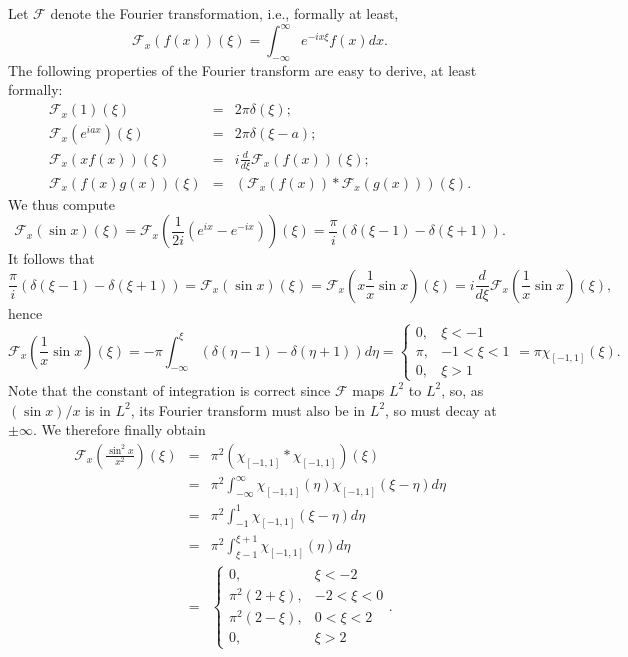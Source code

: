 \documentclass{article}
\begin{document}
\begin{enumerate}
Let \(\mathcal{F}\) denote the Fourier transformation, i.e., formally at least,
\[\mathcal{F}_x(f(x))(\xi) = \int_{-\infty}^{\infty} e^{-i x \xi} f(x) dx.\]
The following properties of the Fourier transform are easy to derive, at least formally:
\begin{eqnarray*}
\mathcal{F}_x(1)(\xi) & = & 2 \pi \delta(\xi); \\
\mathcal{F}_x \left( e^{i a x} \right)(\xi) & = & 2 \pi \delta(\xi - a); \\
\mathcal{F}_x \left( x f(x) \right)(\xi) & = & i \frac{d}{d\xi} \mathcal{F}_x(f(x))(\xi); \\
\mathcal{F}_x \left( f(x) g(x) \right)(\xi) & = & \left( \mathcal{F}_x(f(x)) * \mathcal{F}_x(g(x)) \right)(\xi).
\end{eqnarray*}
We thus compute
\[\mathcal{F}_x(\sin x)(\xi) = \mathcal{F}_x \left( \frac{1}{2 i} \left( e^{i x} - e^{-i x} \right) \right)(\xi) = \frac{\pi}{i} \left( \delta(\xi - 1) - \delta(\xi + 1) \right).\]
It follows that
\[\frac{\pi}{i} \left( \delta(\xi - 1) - \delta(\xi + 1) \right) = \mathcal{F}_x(\sin x)(\xi) = \mathcal{F}_x \left( x \frac{1}{x} \sin x \right)(\xi) = i \frac{d}{d\xi} \mathcal{F}_x \left( \frac{1}{x} \sin x \right)(\xi),\]
hence
\[\mathcal{F}_x \left( \frac{1}{x} \sin x \right)(\xi) = -\pi \int_{-\infty}^{\xi} \left( \delta(\eta - 1) - \delta(\eta + 1) \right) d\eta = \begin{cases} 0, & \xi < -1 \\ \pi, & -1 < \xi < 1 \\ 0, & \xi > 1 \end{cases} = \pi \chi_{[-1,1]}(\xi).\]
Note that the constant of integration is correct since \(\mathcal{F}\) maps \(L^2\) to \(L^2\), so, as \((\sin x)/x\) is in \(L^2\), its Fourier transform must also be in \(L^2\), so must decay at \(\pm \infty\).  We therefore finally obtain
\begin{eqnarray*}
\mathcal{F}_x \left( \frac{\sin^2 x}{x^2} \right)(\xi)
& = & \pi^2 \left( \chi_{[-1,1]} * \chi_{[-1,1]} \right)(\xi) \\
& = & \pi^2 \int_{-\infty}^{\infty} \chi_{[-1,1]}(\eta) \chi_{[-1,1]}(\xi - \eta) d\eta \\
& = & \pi^2 \int_{-1}^1 \chi_{[-1,1]}(\xi - \eta) d\eta \\
& = & \pi^2 \int_{\xi - 1}^{\xi + 1} \chi_{[-1,1]}(\eta) d\eta \\
& = & \begin{cases} 0, & \xi < -2 \\ \pi^2 (2 + \xi), & -2 < \xi < 0 \\ \pi^2 (2 - \xi), & 0 < \xi < 2 \\ 0, & \xi > 2 \end{cases}.
\end{eqnarray*}




\end{enumerate}
\end{document}
